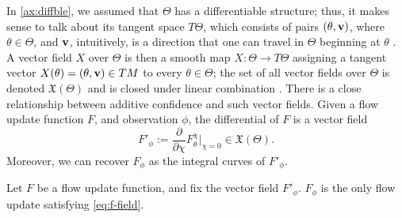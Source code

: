 In \cref{ax:diffble}, we assumed that $\Theta$ has a differentiable 
structure; thus, it makes sense to talk about its tangent space
$T\Theta$, which consists of pairs $(\theta, \mathbf{v})$, where
$\theta \in \Theta$, and $\mathbf{v}$,
intuitively, is a direction that one can travel in $\Theta$ beginning at $\theta$
\parencite[\S3]{lee2013smooth}.
%
%
A vector field $X$ over $\Theta$ is then
a smooth map $X : \Theta \to T \Theta$ 
assigning a tangent vector $X(\theta) = (\theta, \mathbf{v}) \in TM$ 
to every $\theta \in \Theta$; the set of all 
vector fields over $\Theta$ is denoted $\mathfrak X(\Theta)$ and is closed
under linear combination
\parencite[\S8]{lee2013smooth}
\unskip.
There is a close relationship between additive confidence and such vector fields.
Given a flow update function $F$, and observation $\phi$, the
differential of $F$ is a vector field
\begin{equation}
	F'_\phi 
	:= \frac{\partial}{\partial \chi} F_{\theta}^{\chi} \Big|_{\chi=0}
	\in  \mathfrak X(\Theta).
	\label{eq:f-field}
\end{equation}
Moreover, we can recover $F_\phi$ as the integral curves of $F'_\phi$.

\begin{prop}
	Let $F$ be a flow update function, and fix the vector field $F'_{\phi}$.
	$F_\phi$ is the only flow update satisfying \eqref{eq:f-field}.
\end{prop}

